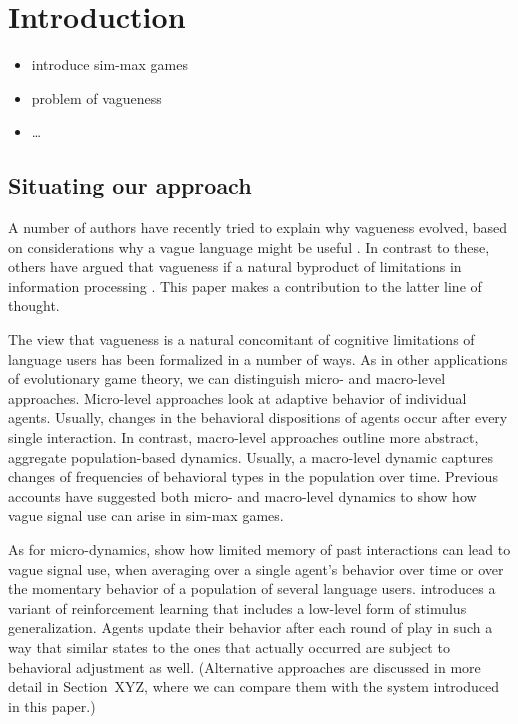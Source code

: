 \section{Introduction}

\begin{itemize}
\item introduce sim-max games
\item problem of vagueness \citep{Lipman2009:Why-is-Language}
\item \dots
\end{itemize}

\subsection{Situating our approach}

A number of authors have recently tried to explain why vagueness
evolved, based on considerations why a vague language might be useful
\citep[e.g.][]{Jaegherde-Jaegher2003:A-Game-Theoreti,Deemter2009:Utility-and-Lan,Jaegherde-JaegherRooijvan-Rooij2010:Strategic-Vague,BlumeBoard2013:Intentional-Vag}. In
contrast to these, others have argued that vagueness if a natural
byproduct of limitations in information processing
\citep[e.g.][]{FrankeJager2010:Vagueness-Signa,OConnor2013:The-Evolution-o}. This
paper makes a contribution to the latter line of thought.

The view that vagueness is a natural concomitant of cognitive
limitations of language users has been formalized in a number of
ways. As in other applications of evolutionary game theory, we can
distinguish micro- and macro-level approaches. Micro-level approaches
look at adaptive behavior of individual agents. Usually, changes in
the behavioral dispositions of agents occur after every single
interaction. In contrast, macro-level approaches outline more
abstract, aggregate population-based dynamics. Usually, a macro-level
dynamic captures changes of frequencies of behavioral types in the
population over time. Previous accounts have suggested both micro- and
macro-level dynamics to show how vague signal use can arise in sim-max
games.

As for micro-dynamics, \citet{FrankeJager2010:Vagueness-Signa} show
how limited memory of past interactions can lead to vague signal use,
when averaging over a single agent's behavior over time or over the
momentary behavior of a population of several language
users. \citet{OConnor2013:The-Evolution-o} introduces a variant of
reinforcement learning that includes a low-level form of stimulus
generalization. Agents update their behavior after each round of play
in such a way that similar states to the ones that actually occurred
are subject to behavioral adjustment as well. (Alternative approaches
are discussed in more detail in Section~XYZ, where we can compare them
with the system introduced in this paper.)

